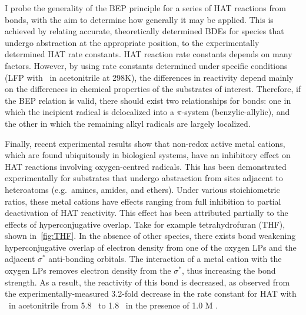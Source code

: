 \begin{doublespace}
I probe the generality of the BEP principle for a series of HAT reactions from
 bonds, with the aim to determine how generally it may be applied. This
is achieved by relating accurate, theoretically determined  BDEs for
species that undergo abstraction at the appropriate  position, to the
experimentally determined HAT rate constants. HAT reaction rate constants
depends on many factors. However, by using rate constants determined under
specific conditions (LFP with \cumo\ in acetonitrile at 298K), the differences
in reactivity depend mainly on the differences in chemical properties of the
substrates of interest. Therefore, if the BEP relation is valid, there should
exist two relationships for  bonds: one in which the incipient radical
is delocalized into a $\pi$-system (benzylic-allylic), and the other in which
the remaining alkyl radicals are largely localized.

Finally, recent experimental results show that non-redox active metal cations,
which are found ubiquitously in biological systems, have an inhibitory effect on
HAT reactions involving oxygen-centred radicals. This has been demonstrated
experimentally for substrates that undergo abstraction from sites adjacent to
heteroatoms (e.g.\ amines, amides, and ethers). Under various stoichiometric
ratios, these metal cations have effects ranging from full inhibition to partial
deactivation of HAT reactivity.\cite{Salamone2013a, Salamone2015metals,
Salamone2016} This effect has been attributed partially to the effects of
hyperconjugative overlap. Take for example tetrahydrofuran (THF), shown
in~\ref{fig:THF}. In the absence of other species, there exists  bond
weakening hyperconjugative overlap of electron density from one of the oxygen
LPs and the adjacent  $\sigma^*$ anti-bonding orbitals. The interaction
of a metal cation with the oxygen LPs removes electron density from the 
$\sigma^*$, thus increasing the  bond strength. As a result, the
reactivity of this bond is decreased, as observed from the
experimentally-measured 3.2-fold decrease in the rate constant for HAT with
\cumo\ in acetonitrile from 5.8  \Ms\ to 1.8  \Ms\ in the presence of
1.0 M .\cite{Salamone2013a}


\end{doublespace}
